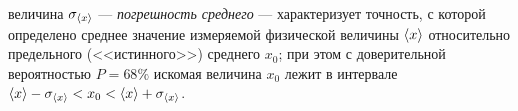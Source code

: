 величина $\sigma_{\left<x\right>}$ --- \emph{погрешность
среднего} --- характеризует точность, с которой определено
среднее значение измеряемой физической величины $\left<x\right>$ относительно
предельного (<<истинного>>) среднего $x_{0}$;
при этом с доверительной вероятностью $P=68\%$ искомая величина $x_{0}$
лежит в интервале $\left<x\right>-\sigma_{\left<x\right>}<x_{0}<\left<x\right>+\sigma_{\left<x\right>}$.





